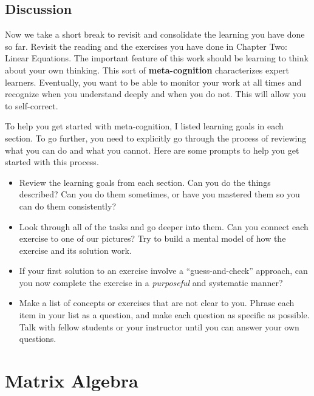 \documentclass[10pt,]{book}
\newcommand{\terminology}[1]{\textbf{#1}}
\theoremstyle{plain}
\theoremstyle{definition}
\numberwithin{equation}{section}
\begin{document}
\subsection[Discussion]{Discussion}\label{subsection-35}
Now we take a short break to revisit and consolidate the learning you
      have done so far. Revisit the reading and the exercises you have done in
      Chapter Two: Linear Equations. The important feature of this work should be
      learning to think about your own thinking. This sort of \terminology{meta-cognition}
      characterizes expert learners. Eventually, you want to be able to monitor
      your work at all times and recognize when you understand deeply and when
      you do not. This will allow you to self-correct.
\par
To help you get started with meta-cognition, I listed learning goals in
      each section. To go further, you need to explicitly go through the process
      of reviewing what you can do and what you cannot. Here are some prompts to
      help you get started with this process.
      \begin{itemize}
\item{}
          Review the learning goals from each section. Can you do the things
          described? Can you do them sometimes, or have you mastered them so you
          can do them consistently?
        \item{}
          Look through all of the tasks and go deeper into them. Can you
          connect each exercise to one of our pictures? Try to build a mental
          model of how the exercise and its solution work.
        \item{}
          If your first solution to an exercise involve a ``guess-and-check''
          approach, can you now complete the exercise in a \emph{purposeful}
          and systematic manner?
        \item{}
          Make a list of concepts or exercises that are not clear to you. Phrase
          each item in your list as a question, and make each question as
          specific as possible. Talk with fellow students or your
          instructor until you can answer your own questions.
        \end{itemize}

\clearpage
\typeout{************************************************}
\typeout{************************************************}
\section[Matrix Algebra]{Matrix Algebra}\label{matrix-algebra}
\typeout{************************************************}
\typeout{************************************************}
\end{document}
